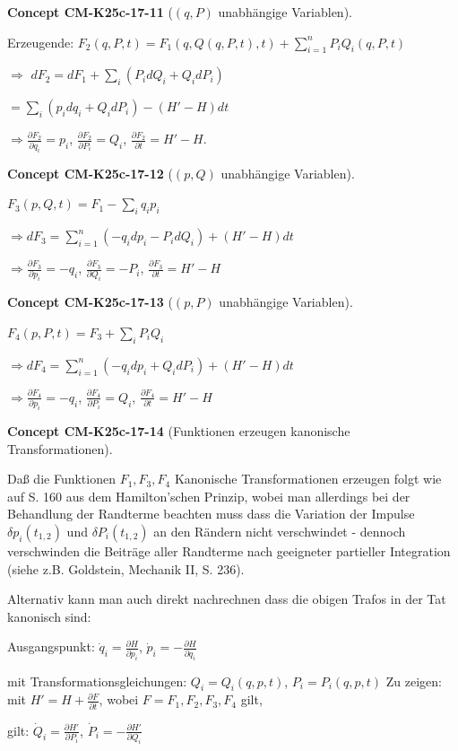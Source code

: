 \documentclass[10pt, letterpaper]{article}
\newcommand{\CustomHeading}[3]{%
  \par\medskip\noindent%
  \textbf{#1 #2} \textnormal{(#3)}.\enskip%
}
\newenvironment{CONC}[2]{\CustomHeading{Concept}{#1}{#2}}{}
\begin{document}
\begin{CONC}{CM-K25c-17-11}{$(q,P)$ unabhängige Variablen}
Erzeugende: $F_2(q,P,t) = F_1(q,Q(q,P,t),t) + \sum_{i=1}^n P_i Q_i(q,P,t)$

$\Rightarrow$ $dF_2 = dF_1 + \sum_i (P_i dQ_i + Q_i dP_i)$

$= \sum_i (p_i dq_i + Q_i dP_i) - (H'-H)dt$

$\Rightarrow \frac{\partial F_2}{\partial q_i} = p_i$, $\frac{\partial F_2}{\partial P_i} = Q_i$, $\frac{\partial F_2}{\partial t} = H'-H$.
\end{CONC}

\begin{CONC}{CM-K25c-17-12}{$(p,Q)$ unabhängige Variablen}
$F_3(p,Q,t) = F_1 - \sum_i q_i p_i$

$\Rightarrow dF_3 = \sum_{i=1}^n (-q_i dp_i - P_i dQ_i) + (H'-H)dt$

$\Rightarrow \frac{\partial F_3}{\partial p_i} = -q_i$, $\frac{\partial F_3}{\partial Q_i} = -P_i$, $\frac{\partial F_3}{\partial t} = H'-H$
\end{CONC}

\begin{CONC}{CM-K25c-17-13}{$(p,P)$ unabhängige Variablen}
$F_4(p,P,t) = F_3 + \sum_i P_i Q_i$

$\Rightarrow dF_4 = \sum_{i=1}^n (-q_i dp_i + Q_i dP_i) + (H'-H)dt$

$\Rightarrow \frac{\partial F_4}{\partial p_i} = -q_i$, $\frac{\partial F_4}{\partial P_i} = Q_i$, $\frac{\partial F_4}{\partial t} = H'-H$
\end{CONC}

\begin{CONC}{CM-K25c-17-14}{Funktionen erzeugen kanonische Transformationen}
Daß die Funktionen $F_1, F_3, F_4$ Kanonische Transformationen erzeugen folgt wie auf S. 160 aus dem Hamilton'schen Prinzip, wobei man allerdings bei der Behandlung der Randterme beachten muss dass die Variation der Impulse $\delta p_i(t_{1,2})$ und $\delta P_i(t_{1,2})$ an den Rändern nicht verschwindet - dennoch verschwinden die Beiträge aller Randterme nach geeigneter partieller Integration (siehe z.B. Goldstein, Mechanik II, S. 236).

Alternativ kann man auch direkt nachrechnen dass die obigen Trafos in der Tat kanonisch sind:

Ausgangspunkt: $\dot{q}_i = \frac{\partial H}{\partial p_i}$, $\dot{p}_i = -\frac{\partial H}{\partial q_i}$

mit Transformationsgleichungen:
$Q_i = Q_i(q,p,t)$, $P_i = P_i(q,p,t)$
Zu zeigen: mit $H' = H + \frac{\partial F}{\partial t}$, wobei $F = F_1, F_2, F_3, F_4$ gilt,

gilt: $\dot{Q}_i = \frac{\partial H'}{\partial P_i}$, $\dot{P}_i = -\frac{\partial H'}{\partial Q_i}$
\end{CONC}
\end{document}
